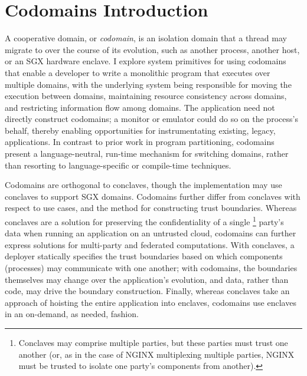 \section{Codomains Introduction}
\label{sec:codomains-intro}

A cooperative domain, or \emph{codomain}, is an isolation domain
that a thread may migrate to over the course of its evolution, such as another
process, another host, or an SGX hardware enclave.
%
I explore system primitives for using codomains that enable a developer to
write a monolithic program that executes over multiple domains, with the
underlying system being responsible for moving the execution between domains,
maintaining resource consistency across domains, and restricting
information flow among domains.
%
The application need not directly construct codomains; a monitor or emulator
could do so on the process's behalf, thereby enabling opportunities for
instrumentating existing, legacy, applications.
%
In contrast to prior work in program partitioning, codomains present
a language-neutral, run-time mechanism for switching domains, rather than
resorting to language-specific or compile-time techniques.


%
Codomains are orthogonal to conclaves, though the implementation may
use conclaves to support SGX domains.
%
Codomains further differ from conclaves with respect to use cases, and the
method for constructing trust boundaries.
%
Whereas conclaves are a solution for preserving the confidentiality of a single
\footnote{
Conclaves may comprise
multiple parties, but these parties must trust one another (or, as in
the case of NGINX multiplexing multiple parties, NGINX must be trusted
to isolate one party's components from another).
}
party's data when running an application on an untrusted cloud,
%
codomains can further express solutions for multi-party and
federated computations.
%
With conclaves, a deployer statically specifies the trust boundaries based on
which components (processes) may communicate with one another;
%
%
with codomains, the boundaries themselves may change over
the application's evolution, and data, rather than code, may drive the boundary
construction.
%
Finally, whereas conclaves take an approach of hoisting the entire application
into enclaves, codomains use enclaves in an on-demand, as needed, fashion.
